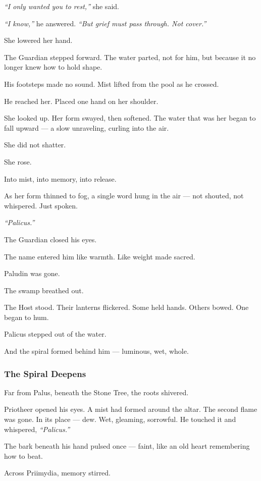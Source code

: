 \documentclass[12pt]{article}
\begin{document}
\textit{``I only wanted you to rest,''} she said.

\textit{``I know,''} he answered. \textit{``But grief must pass through. Not cover.''}

She lowered her hand.

The Guardian stepped forward. The water parted, not for him, but because it no longer knew how to hold shape.

His footsteps made no sound. Mist lifted from the pool as he crossed.

He reached her. Placed one hand on her shoulder.

She looked up. Her form swayed, then softened. The water that was her began to fall upward — a slow unraveling, curling into the air.

She did not shatter.

She rose.

Into mist, into memory, into release.

As her form thinned to fog, a single word hung in the air — not shouted, not whispered. Just spoken.

\textit{``Palicus.''}

The Guardian closed his eyes.

The name entered him like warmth. Like weight made sacred.

Paludin was gone.

The swamp breathed out.

The Host stood. Their lanterns flickered. Some held hands. Others bowed. One began to hum.

Palicus stepped out of the water.

And the spiral formed behind him — luminous, wet, whole.

\dotfill

\subsubsection*{The Spiral Deepens}

Far from Palus, beneath the Stone Tree, the roots shivered.

Priotheer opened his eyes. A mist had formed around the altar. The second flame was gone. In its place — dew. Wet, gleaming, sorrowful. He touched it and whispered, \textit{``Palicus.''}

The bark beneath his hand pulsed once — faint, like an old heart remembering how to beat.

Across Priimydia, memory stirred.
\end{document}
